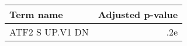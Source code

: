 \begin{tabular}{lr}
\toprule
      Term name &  Adjusted p-value \\
\midrule
ATF2 S UP.V1 DN &               .2e \\
\bottomrule
\end{tabular}
